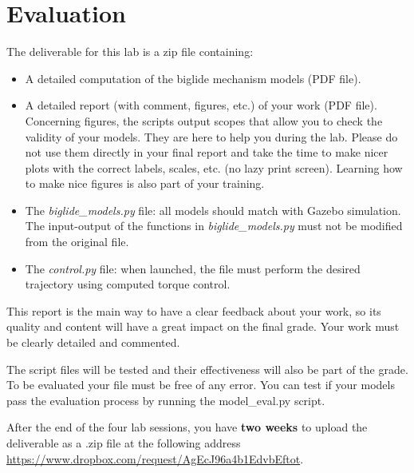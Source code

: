 \documentclass[a4paper]{article}
\begin{document}
\section{Evaluation}
The deliverable for this lab is a zip file containing:
\begin{itemize}
	\item A detailed computation of the biglide mechanism models (PDF file).
	\item A detailed report (with comment, figures, etc.) of your work (PDF file). Concerning figures, the scripts output scopes that allow you to check the validity of your models. They are here to help you during the lab. Please do not use them directly in your final report and take the time to make nicer plots with the correct labels, scales, etc. (no lazy print screen). Learning how to make nice figures is also part of your training.
	\item The \textit{biglide\_models.py} file: all models should match with Gazebo simulation. The input-output of the functions in \textit{biglide\_models.py} must not be modified from the original file.
	\item The \textit{control.py} file: when launched, the file must perform the desired trajectory using computed torque control.
\end{itemize}
This report is the main way to have a clear feedback about your work, so its quality and content will have a great impact on the final grade. Your work must be clearly detailed and commented.

The script files will be tested and their effectiveness will also be part of the grade. To be evaluated your file must be free of any error. You can test if your models pass the evaluation process by running the model\_eval.py script.

After the end of the four lab sessions, you have \textbf{two weeks} to upload the deliverable as a .zip file at the following address  \href{https://www.dropbox.com/request/AgEcJ96a4b1EdvbEftot}{https://www.dropbox.com/request/AgEcJ96a4b1EdvbEftot}.
\end{document}

